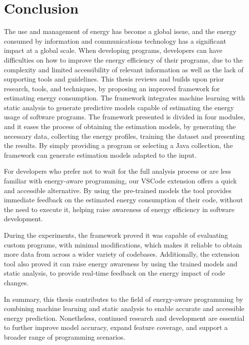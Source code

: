 
\chapter{Conclusion}\label{chapter:conclusion}


The use and management of energy has become a global issue, and the energy consumed by information and communications technology has a significant impact at a global scale. When developing programs, developers can have difficulties on how to improve the energy efficiency of their programs, due to the complexity and limited accessibility of relevant information as well as the lack of supporting tools and guidelines. 
This thesis reviews and builds upon prior research, tools, and techniques, by proposing an improved framework for estimating energy consumption. The framework integrates machine learning with static analysis to generate predictive models capable of estimating the energy usage of software programs.
The framework presented is divided in four modules, and it eases the process of obtaining the estimation models, by generating the necessary data, collecting the energy profiles, training the dataset and presenting the results. By simply providing a program or selecting a Java collection, the framework can generate estimation models adapted to the input. 

For developers who prefer not to wait for the full analysis process or are less familiar with energy-aware programming, our VSCode extension offers a quick and accessible alternative. By using the pre-trained models the tool provides immediate feedback on the estimated energy consumption of their code, without the need to execute it, helping raise awareness of energy efficiency in software development. 

During the experiments, the framework proved it was capable of evaluating custom programs, with minimal modifications, which makes it reliable to obtain more data from across a wider variety of codebases. Additionally, the extension tool also proved it can raise energy awareness by using the trained models and static analysis, to provide real-time feedback on the energy impact of code changes.

In summary, this thesis contributes to the field of energy-aware programming by combining machine learning and static analysis to enable accurate and accessible energy prediction. Nonetheless, continued research and development are essential to further improve model accuracy, expand feature coverage, and support a broader range of programming scenarios.
